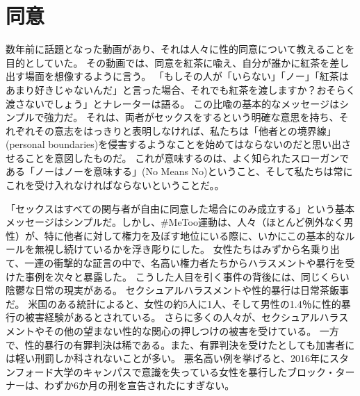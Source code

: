\documentclass[paper=a4,book,openany]{jlreq}
\begin{document}
\chapter{同意}

数年前に話題となった動画があり、それは人々に性的同意について教えることを目的としていた。
その動画では、同意を紅茶に喩え、自分が誰かに紅茶を差し出す場面を想像するように言う。
「もしその人が「いらない」「ノー」「紅茶はあまり好きじゃないんだ」と言った場合、それでも紅茶を渡しますか？おそらく渡さないでしょう」とナレーターは語る。
この比喩の基本的なメッセージはシンプルで強力だ。
それは、両者がセックスをするという明確な意思を持ち、それぞれその意志をはっきりと表明しなければ、私たちは「他者との境界線」(personal boundaries)を侵害するようなことを始めてはならないのだと思い出させることを意図したものだ。
これが意味するのは、よく知られたスローガンである「ノーはノーを意味する」(No Means No)ということ、そして私たちは常にこれを受け入れなければならないということだ。\citep{may15:_consen}。

「セックスはすべての関与者が自由に同意した場合にのみ成立する」という基本メッセージはシンプルだ。しかし、\#MeToo運動は、人々（ほとんど例外なく男性）が、特に他者に対して権力を及ぼす地位にいる際に、いかにこの基本的なルールを無視し続けているかを浮き彫りにした。
女性たちはみずから名乗り出て、一連の衝撃的な証言の中で、名高い権力者たちからハラスメントや暴行を受けた事例を次々と暴露した。
こうした人目を引く事件の背後には、同じくらい陰鬱な日常の現実がある。
セクシュアルハラスメントや性的暴行は日常茶飯事だ。
米国のある統計によると、女性の約5人に1人、そして男性の1.4％に性的暴行の被害経験があるとされている\citep{black11:_nation_intim_partn_sexual_violen_survey}。
さらに多くの人々が、セクシュアルハラスメントやその他の望まない性的な関心の押しつけの被害を受けている。
一方で、性的暴行の有罪判決は稀である。また、有罪判決を受けたとしても加害者には軽い刑罰しか科されないことが多い。
悪名高い例を挙げると、2016年にスタンフォード大学のキャンパスで意識を失っている女性を暴行したブロック・ターナーは、わずか6か月の刑を宣告されたにすぎない\citep{stack16:_light_senten_brock}。
\end{document}

